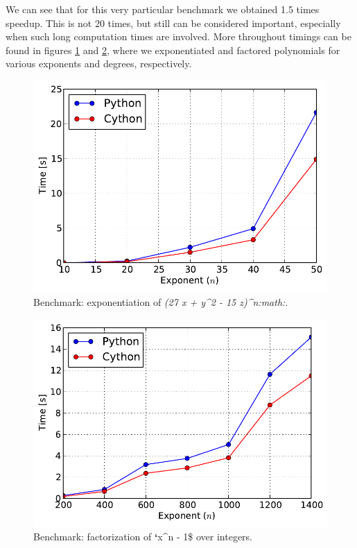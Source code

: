 We can see that for this very particular benchmark we obtained 1.5 times speedup. This is
not 20 times, but still can be considered important, especially when such long computation
times are involved. More throughout timings can be found in figures \ref{fig-cython-power}
and \ref{fig-cython-factor}, where we exponentiated and factored polynomials for various
exponents and degrees, respectively.
\begin{figure}[htbp]
\centering

\includegraphics{cython-power.pdf}
\caption{Benchmark: exponentiation of \emph{(27 x + y\textasciicircum{}2 - 15 z)\textasciicircum{}n:math:}.\label{fig-cython-power}}\end{figure}
\begin{figure}[htbp]
\centering

\includegraphics{cython-factor.pdf}
\caption{Benchmark: factorization of {\color{red}\bfseries{}{}`}x\textasciicircum{}n - 1\$ over integers.\label{fig-cython-factor}}{\small }\end{figure}

